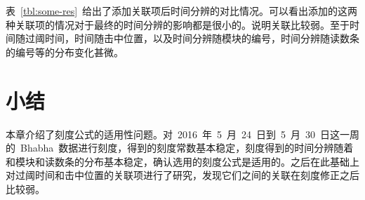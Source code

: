 表~\ref{tbl:some-res}~给出了添加关联项后时间分辨的对比情况。可以看出添加的这两种关联项的情况对于最终的时间分辨的影响都是很小的。说明关联比较弱。至于时间随过阈时间，时间随击中位置，以及时间分辨随模块的编号，时间分辨随读数条的编号等的分布变化甚微。

\section{小结}
本章介绍了刻度公式的适用性问题。对~2016~年~5~月~24~日到~5~月~30~日这一周的~Bhabha~数据进行刻度，得到的刻度常数基本稳定，刻度得到的时间分辨随着和模块和读数条的分布基本稳定，确认选用的刻度公式是适用的。之后在此基础上对过阈时间和击中位置的关联项进行了研究，发现它们之间的关联在刻度修正之后比较弱。








